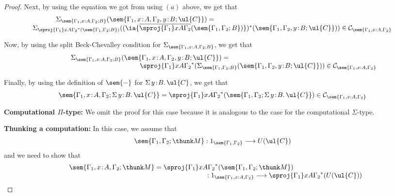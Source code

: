 \begin{proof}
Next, by using the equation we got from using $(a)$ above, we get that
\[
\begin{array}{c}
\hspace{-8cm}
\Sigma_{\sem{\Gamma_1, x : A,\Gamma_2;B}} (\sem{\Gamma_1, x \!:\! A,\Gamma_2, y \!:\! B;\ul{C}}) = 
\\
\Sigma_{\sproj {\Gamma_1} x A {\Gamma_2}^*(\sem{\Gamma_1,\Gamma_2;B})} ((\ia {\overline{\sproj {\Gamma_1} x A {\Gamma_2}}(\sem{\Gamma_1, \Gamma_2;B})})^*(\sem{\Gamma_1,\Gamma_2, y \!:\! B;\ul{C}})) \in \mathcal{C}_{\sem{\Gamma_1, x : A,\Gamma_2}}
\end{array}
\]

Now, by using the split Beck-Chevalley condition for $\Sigma_{\sem{\Gamma_1, x : A,\Gamma_2;B}}$, we get that
\[
\begin{array}{c}
\hspace{-6.5cm}
\Sigma_{\sem{\Gamma_1, x : A,\Gamma_2;B}} (\sem{\Gamma_1, x \!:\! A,\Gamma_2, y \!:\! B;\ul{C}}) = 
\\
\hspace{4.75cm}
\sproj {\Gamma_1} x A {\Gamma_2}^*(\Sigma_{\sem{\Gamma_1,\Gamma_2;B}} (\sem{\Gamma_1,\Gamma_2, y \!:\! B;\ul{C}})) \in \mathcal{C}_{\sem{\Gamma_1, x : A,\Gamma_2}}
\end{array}
\]

Finally, by using the definition of $\sem{-}$ for $\Sigma\, y \!:\! B .\, \ul{C}$, we get that
\[
\sem{\Gamma_1, x \!:\! A,\Gamma_2;\Sigma\, y \!:\! B .\, \ul{C}} = \sproj {\Gamma_1} x A {\Gamma_2}^*(\sem{\Gamma_1,\Gamma_2;\Sigma\, y \!:\! B .\, \ul{C}}) \in \mathcal{C}_{\sem{\Gamma_1, x : A,\Gamma_2}}
\]

\vspace{0.2cm}
\noindent
\textbf{Computational $\Pi$-type:}
We omit the proof for this case because it is analogous to the case for the computational $\Sigma$-type.

\vspace{0.2cm}
\noindent
\textbf{Thunking a computation:}
In this case, we assume that 
\[
\sem{\Gamma_1,\Gamma_2;\thunk M} : 1_{\sem{\Gamma_1,\Gamma_2}} \longrightarrow U(\ul{C})
\]
and we need to show that 
\[
\begin{array}{c}
\hspace{-3.25cm}
\sem{\Gamma_1, x \!:\! A,\Gamma_2;\thunk M} = \sproj {\Gamma_1} x A {\Gamma_2}^*(\sem{\Gamma_1,\Gamma_2;\thunk M}) 
\\
\hspace{7.5cm}
: 1_{\sem{\Gamma_1, x : A,\Gamma_2}} \longrightarrow \sproj {\Gamma_1} x A {\Gamma_2}^*(U(\ul{C}))
\end{array}
\]


\end{proof}
